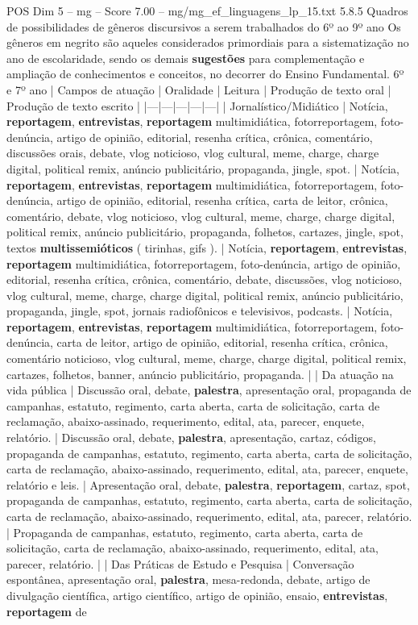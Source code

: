 \begin{textsample}{POS Dim 5 – mg – Score 7.00 – mg/mg\_ef\_linguagens\_lp\_15.txt}  \label{ex:f5_pos_186}
5.8.5 Quadros de possibilidades de gêneros discursivos a serem trabalhados do 6º ao 9º ano Os gêneros em negrito são aqueles considerados primordiais para a sistematização no ano de escolaridade, sendo os demais \textbf{sugestões} para complementação e ampliação de conhecimentos e conceitos, no decorrer do Ensino Fundamental. 6º e 7º ano | Campos de atuação | Oralidade | Leitura | Produção de texto oral | Produção de texto escrito | |---|---|---|---|---| | Jornalístico/Midiático | Notícia, \textbf{reportagem}, \textbf{entrevistas}, \textbf{reportagem} multimidiática, fotorreportagem, foto-denúncia, artigo de opinião, editorial, resenha crítica, crônica, comentário, discussões orais, debate, vlog noticioso, vlog cultural, meme, charge, charge digital, political remix, anúncio publicitário, propaganda, jingle, spot. | Notícia, \textbf{reportagem}, \textbf{entrevistas}, \textbf{reportagem} multimidiática, fotorreportagem, foto-denúncia, artigo de opinião, editorial, resenha crítica, carta de leitor, crônica, comentário, debate, vlog noticioso, vlog cultural, meme, charge, charge digital, political remix, anúncio publicitário, propaganda, folhetos, cartazes, jingle, spot, textos \textbf{multissemióticos} ( tirinhas, gifs ). | Notícia, \textbf{reportagem}, \textbf{entrevistas}, \textbf{reportagem} multimidiática, fotorreportagem, foto-denúncia, artigo de opinião, editorial, resenha crítica, crônica, comentário, debate, discussões, vlog noticioso, vlog cultural, meme, charge, charge digital, political remix, anúncio publicitário, propaganda, jingle, spot, jornais radiofônicos e televisivos, podcasts. | Notícia, \textbf{reportagem}, \textbf{entrevistas}, \textbf{reportagem} multimidiática, fotorreportagem, foto-denúncia, carta de leitor, artigo de opinião, editorial, resenha crítica, crônica, comentário noticioso, vlog cultural, meme, charge, charge digital, political remix, cartazes, folhetos, banner, anúncio publicitário, propaganda. | | Da atuação na vida pública | Discussão oral, debate, \textbf{palestra}, apresentação oral, propaganda de campanhas, estatuto, regimento, carta aberta, carta de solicitação, carta de reclamação, abaixo-assinado, requerimento, edital, ata, parecer, enquete, relatório. | Discussão oral, debate, \textbf{palestra}, apresentação, cartaz, códigos, propaganda de campanhas, estatuto, regimento, carta aberta, carta de solicitação, carta de reclamação, abaixo-assinado, requerimento, edital, ata, parecer, enquete, relatório e leis. | Apresentação oral, debate, \textbf{palestra}, \textbf{reportagem}, cartaz, spot, propaganda de campanhas, estatuto, regimento, carta aberta, carta de solicitação, carta de reclamação, abaixo-assinado, requerimento, edital, ata, parecer, relatório. | Propaganda de campanhas, estatuto, regimento, carta aberta, carta de solicitação, carta de reclamação, abaixo-assinado, requerimento, edital, ata, parecer, relatório. | | Das Práticas de Estudo e Pesquisa | Conversação espontânea, apresentação oral, \textbf{palestra}, mesa-redonda, debate, artigo de divulgação científica, artigo científico, artigo de opinião, ensaio, \textbf{entrevistas}, \textbf{reportagem} de 
\end{textsample}
